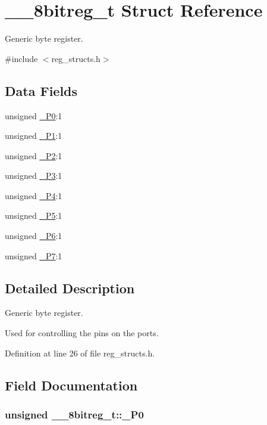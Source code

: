 \hypertarget{struct____8bitreg__t}{\section{\-\_\-\-\_\-8bitreg\-\_\-t Struct Reference}
\label{struct____8bitreg__t}
}


Generic byte register.  




{\ttfamily \#include $<$reg\-\_\-structs.\-h$>$}

\subsection*{Data Fields}
\begin{DoxyCompactItemize}
\item 
unsigned \hyperlink{struct____8bitreg__t_a1c9e01d434d8eb4c6a45b76dd4f1175f}{\-\_\-\-P0}\-:1
\item 
unsigned \hyperlink{struct____8bitreg__t_a108c964a03f1123681899156b636e203}{\-\_\-\-P1}\-:1
\item 
unsigned \hyperlink{struct____8bitreg__t_a30b9937367ef01f1adc9f4353c9c323e}{\-\_\-\-P2}\-:1
\item 
unsigned \hyperlink{struct____8bitreg__t_a5d21a8af52e9e72f540bc6032d7c1047}{\-\_\-\-P3}\-:1
\item 
unsigned \hyperlink{struct____8bitreg__t_a8e1225a088df1088350fd78a57fa38b4}{\-\_\-\-P4}\-:1
\item 
unsigned \hyperlink{struct____8bitreg__t_a4a51fd205ff67d3523e92697adc2fc86}{\-\_\-\-P5}\-:1
\item 
unsigned \hyperlink{struct____8bitreg__t_aa3a7604eeb889d347ef856be027dc6ba}{\-\_\-\-P6}\-:1
\item 
unsigned \hyperlink{struct____8bitreg__t_aae126f699a2181048e367daeaa2abc3f}{\-\_\-\-P7}\-:1
\end{DoxyCompactItemize}


\subsection{Detailed Description}
Generic byte register. 

Used for controlling the pins on the ports. 

Definition at line 26 of file reg\-\_\-structs.\-h.



\subsection{Field Documentation}
\hypertarget{struct____8bitreg__t_a1c9e01d434d8eb4c6a45b76dd4f1175f}{
\subsubsection[{\-\_\-\-P0}]{\setlength{\rightskip}{0pt plus 5cm}unsigned \-\_\-\-\_\-8bitreg\-\_\-t\-::\-\_\-\-P0}}\label{struct____8bitreg__t_a1c9e01d434d8eb4c6a45b76dd4f1175f}


